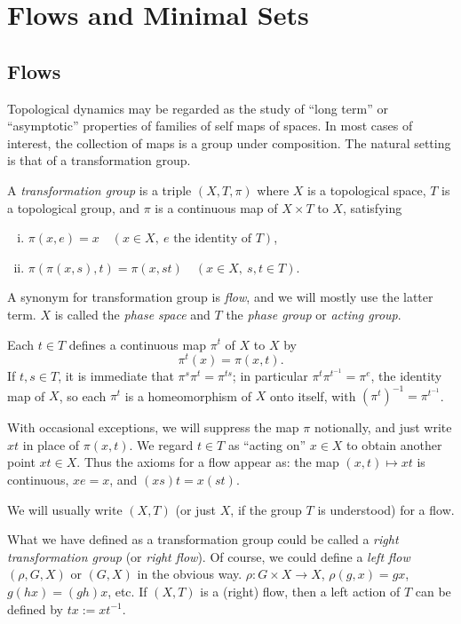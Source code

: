 

\chapter{Flows and Minimal Sets}

\section{Flows}

Topological dynamics may be regarded as the study of ``long term'' or ``asymptotic'' properties of families of self maps of spaces. In most cases of interest, the collection of maps is a group under composition. The natural setting is that of a transformation group.

\begin{definition}
    A \emph{transformation group} is a triple $(X, T, \pi)$ where $X$ is a topological space, $T$ is a topological group, and $\pi$ is a continuous map of $X \times T$ to $X$, satisfying
    \begin{enumerate}[(i)]
        \item $\pi(x,e) = x \quad (x \in X,\ e \text{ the identity of } T)$,
        \item $\pi(\pi(x,s),t) = \pi(x,st) \quad (x \in X,\ s,t \in T)$.
    \end{enumerate}
\end{definition}

A synonym for transformation group is \emph{flow}, and we will mostly use the latter term. $X$ is called the \emph{phase space} and $T$ the \emph{phase group} or \emph{acting group}.

Each $t \in T$ defines a continuous map $\pi^{t}$ of $X$ to $X$ by
\[
    \pi^{t}(x) = \pi(x,t).
\]
If $t,s \in T$, it is immediate that $\pi^{s}\pi^{t} = \pi^{ts}$; in particular $\pi^{t}\pi^{t^{-1}} = \pi^{e}$, the identity map of $X$, so each $\pi^{t}$ is a homeomorphism of $X$ onto itself, with $(\pi^{t})^{-1} = \pi^{t^{-1}}$.

With occasional exceptions, we will suppress the map $\pi$ notionally, and just write $xt$ in place of $\pi(x,t)$. We regard $t \in T$ as ``acting on'' $x \in X$ to obtain another point $xt \in X$. Thus the axioms for a flow appear as: the map $(x,t) \mapsto xt$ is continuous, $xe = x$, and $(xs)t = x(st)$.

We will usually write $(X,T)$ (or just $X$, if the group $T$ is understood) for a flow.

What we have defined as a transformation group could be called a \emph{right transformation group} (or \emph{right flow}). Of course, we could define a \emph{left flow} $(\rho, G, X)$ or $(G, X)$ in the obvious way. $\rho : G \times X \to X$, $\rho(g,x) = gx$, $g(hx) = (gh)x$, etc. If $(X, T)$ is a (right) flow, then a left action of $T$ can be defined by $tx := xt^{-1}$.


